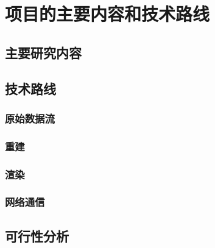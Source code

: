 \section{项目的主要内容和技术路线}

\subsection{主要研究内容}
\subsection{技术路线}
\subsubsection{原始数据流}
\subsubsection{重建}
\subsubsection{渲染}
\subsubsection{网络通信}
\subsection{可行性分析}
